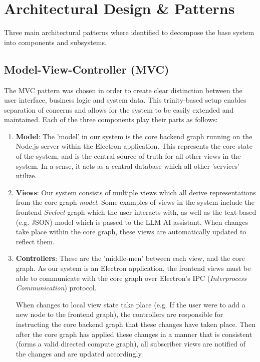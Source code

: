 \documentclass[11pt,a4paper]{article}
\begin{document}
\section{Architectural Design \& Patterns}
Three main architectural patterns where identified to decompose the base system
into components and subsystems.

\subsection{Model-View-Controller (MVC)}
The MVC pattern was chosen in order to create clear distinction between the user
interface, business logic and system data. This trinity-based setup enables separation of concerns and allows for the system to be easily extended and maintained.
Each of the three components play their parts as follows:
\begin{enumerate}[label*=\arabic*.]
	\item[\textbullet] {\bf Model}: The 'model' in our system is the core backend graph running on the Node.js server within the Electron application.
	This represents the core state of the system, and is the central source of truth for all other views in the system. In a sense, it acts as a central database which all other 'services' utilize.
	\item[\textbullet] {\bf Views}: Our system consists of multiple views which all derive representations from the core graph {\it model}.
	Some examples of views in the system include the frontend {\it Svelvet} graph which the user interacts with, as well as the text-based (e.g. JSON) model which is passed to the LLM AI assistant.
	When changes take place within the core graph, these views are automatically updated to reflect them.
	\item[\textbullet] {\bf Controllers}: These are the 'middle-men' between each view, and the core graph.
	As our system is an Electron application, the frontend views must be able to communicate with the core graph over Electron's IPC ({\it Interprocess Communication}) protocol.

	When changes to local view state take place (e.g. If the user were to add a new node to the frontend graph), the controllers are responsible for instructing the core backend graph that these changes have taken place.
	Then after the core graph has applied these changes in a manner that is consistent (forms a valid directed compute graph), all subscriber views are notified of the changes and are updated accordingly.
\end{enumerate}
\end{document}
